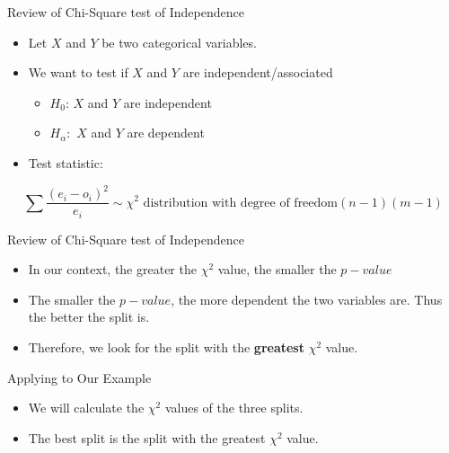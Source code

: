 \documentclass[
  ignorenonframetext,
]{beamer}
\providecommand{\tightlist}{%
  \setlength{\itemsep}{0pt}\setlength{\parskip}{0pt}}\usepackage{longtable,booktabs,array}
\begin{document}
\begin{frame}{Review of Chi-Square test of Independence}
\label{review-of-chi-square-test-of-independence}
\begin{itemize}
\tightlist
\item
  Let \(X\) and \(Y\) be two categorical variables.
\item
  We want to test if \(X\) and \(Y\) are independent/associated

  \begin{itemize}
  \tightlist
  \item
    \(H_0\): \(X\) and \(Y\) are independent
  \item
    \(H_{\alpha}:\) \(X\) and \(Y\) are dependent
  \end{itemize}
\item
  Test statistic:
\end{itemize}

\[\sum\frac{(e_i-o_i)^2}{e_i} \sim \chi^2 \text{ distribution with degree of freedom} (n-1)(m-1)\]
\end{frame}

\begin{frame}{Review of Chi-Square test of Independence}
\label{review-of-chi-square-test-of-independence-1}
\begin{itemize}
\tightlist
\item
  In our context, the greater the \(\chi^2\) value, the smaller the
  \(p-value\)
\item
  The smaller the \(p-value\), the more dependent the two variables are.
  Thus the better the split is.
\item
  Therefore, we look for the split with the \textbf{greatest} \(\chi^2\)
  value.
\end{itemize}
\end{frame}

\begin{frame}{Applying to Our Example}
\label{applying-to-our-example}
\begin{itemize}
\tightlist
\item
  We will calculate the \(\chi^2\) values of the three splits.\\
\item
  The best split is the split with the greatest \(\chi^2\) value.
\end{itemize}
\end{frame}
\end{document}
